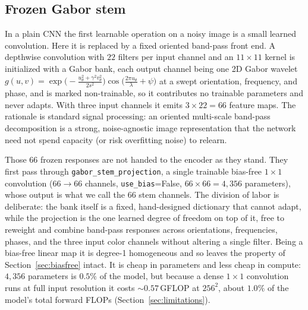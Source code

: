 \documentclass{article}
\begin{document}
\subsection{Frozen Gabor stem}
In a plain CNN the first learnable operation on a noisy image is a small learned convolution. Here it is replaced by a fixed oriented band-pass front end. A depthwise convolution with $22$ filters per input channel and an $11{\times}11$ kernel is initialized with a Gabor bank, each output channel being one 2D Gabor wavelet $g(u,v)=\exp\!\big(-\tfrac{u_\theta^2+\gamma^2 v_\theta^2}{2s^2}\big)\cos\!\big(\tfrac{2\pi u_\theta}{\lambda}+\psi\big)$ at a swept orientation, frequency, and phase, and is marked non-trainable, so it contributes no trainable parameters and never adapts. With three input channels it emits $3\times 22 = 66$ feature maps. The rationale is standard signal processing: an oriented multi-scale band-pass decomposition is a strong, noise-agnostic image representation that the network need not spend capacity (or risk overfitting noise) to relearn.

Those $66$ frozen responses are not handed to the encoder as they stand. They first pass through \texttt{gabor\_\allowbreak stem\_\allowbreak projection}, a single trainable bias-free $1{\times}1$ convolution ($66 \to 66$ channels, \texttt{use\_bias}=False, $66 \times 66 = 4{,}356$ parameters), whose output is what we call the $66$ stem channels. The division of labor is deliberate: the bank itself is a fixed, hand-designed dictionary that cannot adapt, while the projection is the one learned degree of freedom on top of it, free to reweight and combine band-pass responses across orientations, frequencies, phases, and the three input color channels without altering a single filter. Being a bias-free linear map it is degree-1 homogeneous and so leaves the property of Section~\ref{sec:biasfree} intact. It is cheap in parameters and less cheap in compute: $4{,}356$ parameters is $0.5\%$ of the model, but because a dense $1{\times}1$ convolution runs at full input resolution it costs $\sim\!0.57$\,GFLOP at $256^2$, about $1.0\%$ of the model's total forward FLOPs (Section~\ref{sec:limitations}).
\end{document}
